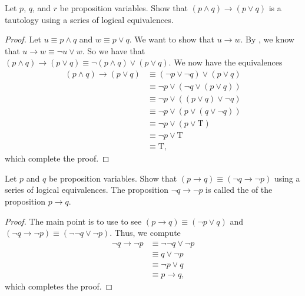 \documentclass[../main.tex]{subfiles}
\begin{document}
\begin{example}
    Let $p$, $q$, and $r$ be proposition variables. Show that $(p \land q) \rightarrow (p \lor q )$ is a tautology using a series of logical equivalences.
\end{example}
\begin{proof}
    Let $u \equiv p \land q$ and $w \equiv p \lor q$. We want to show that $u \rightarrow w$. By , we know that $u \rightarrow w \equiv \neg u \lor w.$ So we have that $(p \land q) \rightarrow (p \lor q ) \equiv \neg(p \land q) \lor (p \lor q )$. We now have the equivalences
    \begin{align*}
        (p \land q) \rightarrow (p \lor q ) &\equiv (\neg p \lor \neg q) \lor (p \lor q ) \tag{De Morgan's Laws} \\
        &\equiv \neg p \lor (\neg q \lor (p \lor q )) \tag{Associative Laws} \\
        &\equiv \neg p \lor ( (p \lor q )\lor \neg q) \tag{Commutative Laws} \\
        &\equiv \neg p \lor ( p \lor (q \lor \neg q)) \tag{Associative Laws} \\
        &\equiv \neg p \lor ( p \lor \text{T}) \tag{Negation Laws} \\
        &\equiv \neg p \lor \text{T} \tag{Negation Laws} \\
        &\equiv \text{T} \tag{Negation Laws},
    \end{align*}
    which complete the proof.
\end{proof}
\begin{example}[contraposition] \label{exe:contraposition}
    Let $p$ and $q$ be proposition variables. Show that $(p\to q)\equiv(\lnot q\to\lnot p)$ using a series of logical equivalences. The proposition $\lnot q\to\lnot p$ is called the  of the proposition $p\to q$.
\end{example}
\begin{proof}
    The main point is to use  to see $(p\to q)\equiv(\lnot p\lor q)$ and $(\lnot q\to\lnot p)\equiv(\lnot\lnot q\lor\lnot p)$. Thus, we compute
    \begin{align*}
        \lnot q\to\lnot p &\equiv \lnot\lnot q\lor\lnot p \\
        &\equiv q\lor\lnot p \tag{Double Negation Law} \\
        &\equiv \lnot p\lor q \tag{Commutative Laws} \\
        &\equiv p\to q,
    \end{align*}
    which completes the proof.
\end{proof}
\end{document}
